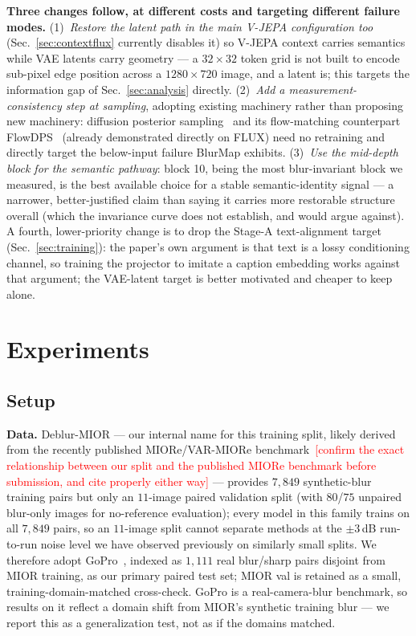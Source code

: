 \documentclass{article}
\newcommand{\authnote}[1]{\textcolor{red}{\footnotesize [#1]}}
\begin{document}
\textbf{Three changes follow, at different costs and targeting different failure modes.} (1)~\emph{Restore the latent path in the main V-JEPA configuration too} (Sec.~\ref{sec:contextflux} currently disables it) so V-JEPA context carries semantics while VAE latents carry geometry — a $32{\times}32$ token grid is not built to encode sub-pixel edge position across a $1280{\times}720$ image, and a latent is; this targets the information gap of Sec.~\ref{sec:analysis} directly. (2)~\emph{Add a measurement-consistency step at sampling}, adopting existing machinery rather than proposing new machinery: diffusion posterior sampling~\cite{chung2023diffusion} and its flow-matching counterpart FlowDPS~\cite{flowdps2025} (already demonstrated directly on FLUX) need no retraining and directly target the below-input failure BlurMap exhibits. (3)~\emph{Use the mid-depth block for the semantic pathway}: block 10, being the most blur-invariant block we measured, is the best available choice for a stable semantic-identity signal — a narrower, better-justified claim than saying it carries more restorable structure overall (which the invariance curve does not establish, and would argue against). A fourth, lower-priority change is to drop the Stage-A text-alignment target (Sec.~\ref{sec:training}): the paper's own argument is that text is a lossy conditioning channel, so training the projector to imitate a caption embedding works against that argument; the VAE-latent target is better motivated and cheaper to keep alone.

\section{Experiments}
\label{sec:experiments}

\subsection{Setup}
\textbf{Data.} Deblur-MIOR — our internal name for this training split, likely derived from the recently published MIORe/VAR-MIORe benchmark~\cite{miore2025}\authnote{confirm the exact relationship between our split and the published MIORe benchmark before submission, and cite properly either way} — provides $7{,}849$ synthetic-blur training pairs but only an $11$-image paired validation split (with $80$/$75$ unpaired blur-only images for no-reference evaluation); every model in this family trains on all $7{,}849$ pairs, so an $11$-image split cannot separate methods at the $\pm 3$\,dB run-to-run noise level we have observed previously on similarly small splits. We therefore adopt GoPro~\cite{nah2017deep}, indexed as $1{,}111$ real blur/sharp pairs disjoint from MIOR training, as our primary paired test set; MIOR val is retained as a small, training-domain-matched cross-check. GoPro is a real-camera-blur benchmark, so results on it reflect a domain shift from MIOR's synthetic training blur — we report this as a generalization test, not as if the domains matched.
\end{document}
